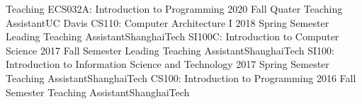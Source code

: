 \ifx\lang\eng
	\begin{rSection}{Teaching}
		\rItem 
			{ECS032A: Introduction to Programming}{ 2020 Fall Quater }
			{Teaching Assistant}{UC Davis}
		\rItem
			{CS110: Computer Architecture I }{ 2018 Spring Semester }
			{Leading Teaching Assistant}{ShanghaiTech}
		\rItem
			{SI100C: Introduction to Computer Science }{ 2017 Fall Semester }
			{Leading Teaching Assistant}{ShanghaiTech}
		\rItem
			{SI100: Introduction to Information Science and Technology }{ 2017 Spring Semester }
			{Teaching Assistant}{ShanghaiTech}
		\rItem
			{CS100: Introduction to Programming }{ 2016 Fall Semester }
			{Teaching Assistant}{ShanghaiTech}
	\end{rSection}
	\vspace{-1.75em}
\fi